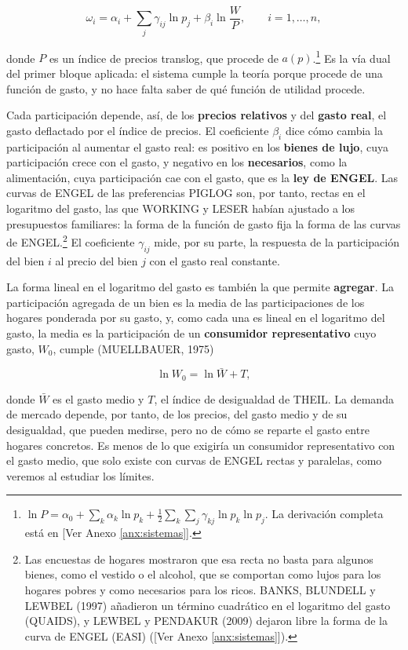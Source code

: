 \documentclass[10pt,a4paper]{article}
\newcommand{\authorfont}[1]{{\fontfamily{EBGaramond-TLF}\selectfont #1}}
\begin{document}
$$\omega_i=\alpha_i+\sum_{j}\gamma_{ij}\ln p_j+\beta_i\ln\frac{W}{P},\qquad i=1,\dots,n,$$

donde $P$ es un índice de precios translog, que procede de $a(p)$.\footnote{%
    $\ln P=\alpha_0+\sum_k\alpha_k\ln p_k+\frac12\sum_k\sum_j\gamma_{kj}\ln p_k\ln p_j$. La derivación completa está en [\authorfont{Ver Anexo \ref{anx:sistemas}}].
} Es la vía dual del primer bloque aplicada: el sistema cumple la teoría porque procede de una función de gasto, y no hace falta saber de qué función de utilidad procede.

Cada participación depende, así, de los \textbf{precios relativos} y del \textbf{gasto real}, el gasto deflactado por el índice de precios. El coeficiente $\beta_i$ dice cómo cambia la participación al aumentar el gasto real: es positivo en los \textbf{bienes de lujo}, cuya participación crece con el gasto, y negativo en los \textbf{necesarios}, como la alimentación, cuya participación cae con el gasto, que es la \textbf{ley de ENGEL}. Las curvas de ENGEL de las preferencias PIGLOG son, por tanto, rectas en el logaritmo del gasto, las que WORKING y LESER habían ajustado a los presupuestos familiares: la forma de la función de gasto fija la forma de las curvas de ENGEL.\footnote{%
    Las encuestas de hogares mostraron que esa recta no basta para algunos bienes, como el vestido o el alcohol, que se comportan como lujos para los hogares pobres y como necesarios para los ricos. BANKS, BLUNDELL y LEWBEL (1997) añadieron un término cuadrático en el logaritmo del gasto (QUAIDS), y LEWBEL y PENDAKUR (2009) dejaron libre la forma de la curva de ENGEL (EASI) ([\authorfont{Ver Anexo \ref{anx:sistemas}}]).
} El coeficiente $\gamma_{ij}$ mide, por su parte, la respuesta de la participación del bien $i$ al precio del bien $j$ con el gasto real constante.

La forma lineal en el logaritmo del gasto es también la que permite \textbf{agregar}. La participación agregada de un bien es la media de las participaciones de los hogares ponderada por su gasto, y, como cada una es lineal en el logaritmo del gasto, la media es la participación de un \textbf{consumidor representativo} cuyo gasto, $W_0$, cumple (MUELLBAUER, 1975)

$$\ln W_0=\ln\bar W+T,$$

donde $\bar W$ es el gasto medio y $T$, el índice de desigualdad de THEIL. La demanda de mercado depende, por tanto, de los precios, del gasto medio y de su desigualdad, que pueden medirse, pero no de cómo se reparte el gasto entre hogares concretos. Es menos de lo que exigiría un consumidor representativo con el gasto medio, que solo existe con curvas de ENGEL rectas y paralelas, como veremos al estudiar los límites.
\end{document}
